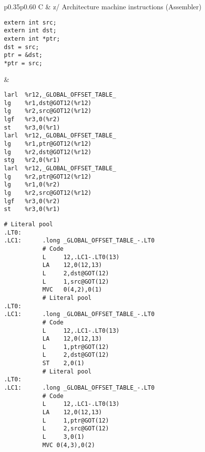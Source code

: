 \documentclass[english,11pt,twoside,toc=bib,toc=idx]{scrreprt}
\newcommand{\ARCH}{z/\kern-1pt Ar\-chi\-tec\-ture}
\newcommand{\ARCH}{ESA/390}
\newenvironment{DIFnomarkup}{}{} %
\begin{document}
\begin{table}
  \centering
  \begin{DIFnomarkup}
  \begin{tabular}{p{}p{}}
    \toprule
    C & \ARCH{} machine instructions (Assembler) \\
    \midrule
\begin{lstlisting}[style=short]
extern int src;
extern int dst;
extern int *ptr;
dst = src;
ptr = &dst;
*ptr = src;
\end{lstlisting}
    &
\ifzseries
\begin{lstlisting}[style=short,language=simpleasm]
larl  %r12,_GLOBAL_OFFSET_TABLE_
lg    %r1,dst@GOT12(%r12)
lg    %r2,src@GOT12(%r12)
lgf   %r3,0(%r2)
st    %r3,0(%r1)
larl  %r12,_GLOBAL_OFFSET_TABLE_
lg    %r1,ptr@GOT12(%r12)
lg    %r2,dst@GOT12(%r12)
stg   %r2,0(%r1)
larl  %r12,_GLOBAL_OFFSET_TABLE_
lg    %r2,ptr@GOT12(%r12)
lg    %r1,0(%r2)
lg    %r2,src@GOT12(%r12)
lgf   %r3,0(%r2)
st    %r3,0(%r1)
\end{lstlisting}
\else
\begin{lstlisting}[style=short,language=simpleasm]
           # Literal pool
.LT0:
.LC1:      .long _GLOBAL_OFFSET_TABLE_-.LT0
           # Code
           L     12,.LC1-.LT0(13)
           LA    12,0(12,13)
           L     2,dst@GOT(12)
           L     1,src@GOT(12)
           MVC   0(4,2),0(1)
           # Literal pool
.LT0:
.LC1:      .long _GLOBAL_OFFSET_TABLE_-.LT0
           # Code
           L     12,.LC1-.LT0(13)
           LA    12,0(12,13)
           L     1,ptr@GOT(12)
           L     2,dst@GOT(12)
           ST    2,0(1)
           # Literal pool
.LT0:
.LC1:      .long _GLOBAL_OFFSET_TABLE_-.LT0
           # Code
           L     12,.LC1-.LT0(13)
           LA    12,0(12,13)
           L     1,ptr@GOT(12)
           L     2,src@GOT(12)
           L     3,0(1)
           MVC 0(4,3),0(2)
\end{lstlisting}
\fi \\
    \bottomrule
  \end{tabular}
  \end{DIFnomarkup}
  \caption{Small model position-independent addressing}
\end{table}
\end{document}
